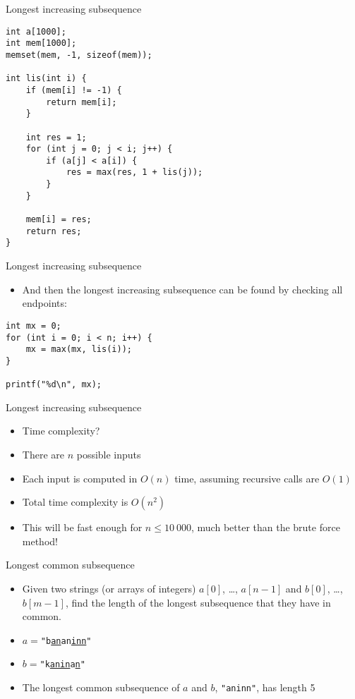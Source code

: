 \documentclass[12pt,t]{beamer}
\newcommand{\bi}{\begin{itemize}}
\newcommand{\ei}{\end{itemize}}
\begin{document}
\begin{frame}[fragile]{Longest increasing subsequence}
    \begin{verbatim}
int a[1000];
int mem[1000];
memset(mem, -1, sizeof(mem));

int lis(int i) {
    if (mem[i] != -1) {
        return mem[i];
    }

    int res = 1;
    for (int j = 0; j < i; j++) {
        if (a[j] < a[i]) {
            res = max(res, 1 + lis(j));
        }
    }

    mem[i] = res;
    return res;
}
    \end{verbatim}
\end{frame}

\begin{frame}[fragile]{Longest increasing subsequence}
    \vspace{30pt}

    \bi
        \item And then the longest increasing subsequence can be found by checking all endpoints:
    \ei

    \begin{verbatim}
int mx = 0;
for (int i = 0; i < n; i++) {
    mx = max(mx, lis(i));
}

printf("%d\n", mx);
    \end{verbatim}
\end{frame}

\begin{frame}{Longest increasing subsequence}
    \vspace{30pt}
    \bi
        \item Time complexity?
            \vspace{10pt}
        \item There are $n$ possible inputs
        \item Each input is computed in $O(n)$ time, assuming recursive calls are $O(1)$
        \item Total time complexity is $O(n^2)$
            \vspace{10pt}
        \item This will be fast enough for $n \leq 10\ 000$, much better than the brute force method!
    \ei
\end{frame}


\begin{frame}{Longest common subsequence}
    \vspace{20pt}
    \bi
\item Given two strings (or arrays of integers) $a[0]$, \ldots, $a[n-1]$ and $b[0]$, \ldots, $b[m-1]$, find the length of the longest subsequence that they have in common.

    \vspace{10pt}
\item $a = $\texttt{"b\underline{an}an\underline{inn}"}
\item $b = $\texttt{"k\underline{anin}a\underline{n}"}
    \vspace{5pt}
\item The longest common subsequence of $a$ and $b$, \texttt{"aninn"}, has length 5
    \ei
\end{frame}
\end{document}
